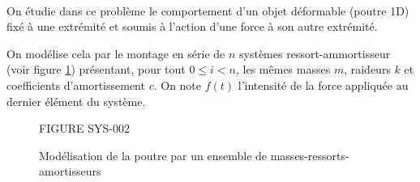 \exer{[SYS-002]}
\setcounter{numques}{0}~\\


On étudie dans ce problème le comportement d'un objet déformable (poutre 1D) fixé à une extrémité et soumis à l'action d'une force à son autre extrémité. 

On modélise cela par le montage en série de $n$ systèmes ressort-ammortisseur (voir figure \ref{fig1}) présentant, pour tout $0 \leq i < n$, 
les mêmes masses  $m$, raideurs $k$ et coefficients d'amortissement $c$.
On note $f(t)$ l'intensité de la force appliquée au dernier élément du système. 


\begin{figure}[!htb]
\begin{center}
%
%
%
FIGURE SYS-002
\end{center}
\caption{Modélisation de la poutre par un ensemble de masses-ressorts-amortisseurs\label{fig1}}
\end{figure}



